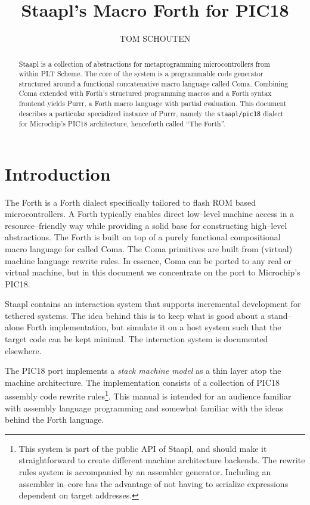 \documentclass[12pt]{article}
\begin{document}
\title{{\LARGE \textbf{Staapl's Macro Forth for PIC18}}}
\author{\large TOM SCHOUTEN}
 \maketitle

\begin{abstract}
  Staapl is a collection of abstractions for metaprogramming
  microcontrollers from within PLT Scheme. The core of the system is a
  programmable code generator structured around a functional
  concatenative macro language called Coma. Combining Coma extended
  with Forth's structured programming macros and a Forth syntax
  frontend yields Purrr, a Forth macro language with partial
  evaluation. This document describes a particular specialized
  instance of Purrr, namely the \verb+staapl/pic18+ dialect for
  Microchip's PIC18 architecture, henceforth called ``The Forth''.
\end{abstract}


\section{Introduction}

The Forth is a Forth dialect specifically tailored to flash ROM based
microcontrollers. A Forth typically enables direct low--level machine
access in a resource--friendly way while providing a solid base for
constructing high--level abstractions. The Forth is built on top of a
purely functional compositional macro language for called Coma. The
Coma primitives are built from (virtual) machine language rewrite
rules. In essence, Coma can be ported to any real or virtual machine,
but in this document we concentrate on the port to Microchip's PIC18.

Staapl contains an interaction system that supports incremental
development for tethered systems. The idea behind this is to keep what
is good about a stand--alone Forth implementation, but simulate it on
a host system such that the target code can be kept minimal. The
interaction system is documented elsewhere.

The PIC18 port implements a \emph{stack machine model} as a thin layer
atop the machine architecture. The implementation consists of a
collection of PIC18 assembly code rewrite rules\footnote{This system
  is part of the public API of Staapl, and should make it
  straightforward to create different machine architecture
  backends. The rewrite rules system is accompanied by an assembler
  generator. Including an assembler in--core has the advantage of not
  having to serialize expressions dependent on target addresses.
}. This manual is intended for an audience familiar with assembly
language programming and somewhat familiar with the ideas behind the
Forth language.
\end{document}
